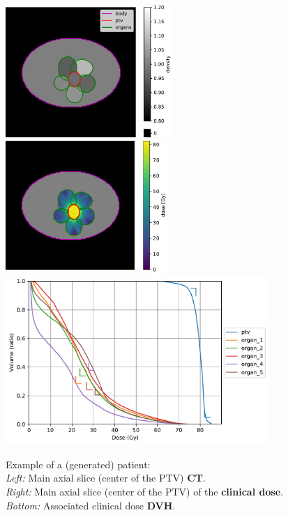 \begin{figure}
	\centering
	\label{fig:main_slice-ct}	\includegraphics[height=5cm]{main_slice-ct.pdf}
	\hspace{1cm}
	\label{fig:main_slice-dose}
	\includegraphics[height=5cm]{main_slice-dose.pdf}
	\\
	\label{fig:clinical_dvh}
	\includegraphics[width=10cm]{dvh_example.pdf}
	\caption{
		Example of a (generated) patient: \\
		\textit{Left:} Main axial slice (center of the PTV) \textbf{CT}.\\
		\textit{Right:} Main axial slice (center of the PTV) of the \textbf{clinical dose}. \\
		\textit{Bottom:} Associated clinical dose \textbf{DVH}.
	}
	
\end{figure}

